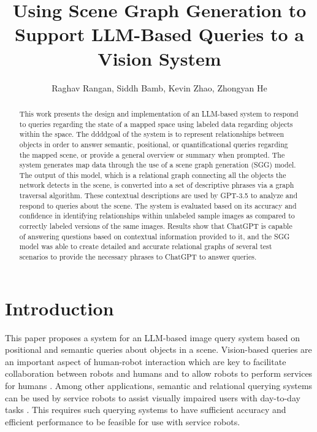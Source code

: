 \documentclass[letterpaper, 10 pt, conference]{ieeeconf}  %
\title{\LARGE \bf
Using Scene Graph Generation to Support LLM-Based Queries to a Vision System}
\author{Raghav Rangan, Siddh Bamb, Kevin Zhao, Zhongyan He%
}
\begin{document}
\maketitle
\thispagestyle{empty}
\pagestyle{empty}


\begin{abstract}
    This work presents the design and implementation of an LLM-based system to respond to queries regarding the state of a mapped space using labeled data regarding objects within the space. The ddddgoal of the system is to represent relationships between objects in order to answer semantic, positional, or quantificational queries regarding the mapped scene, or provide a general overview or summary when prompted. The system generates map data through the use of a scene graph generation (SGG) model. The output of this model, which is a relational graph connecting all the objects the network detects in the scene, is converted into a set of descriptive phrases via a graph traversal algorithm. These contextual descriptions are used by GPT-3.5 to analyze and respond to queries about the scene. The system is evaluated based on its accuracy and confidence in identifying relationships within unlabeled sample images as compared to correctly labeled versions of the same images. Results show that ChatGPT is capable of answering questions based on contextual information provided to it, and the SGG model was able to create detailed and accurate relational graphs of several test scenarios to provide the necessary phrases to ChatGPT to answer queries.
\end{abstract}
    
\section{Introduction}
    This paper proposes a system for an LLM-based image query system based on positional and semantic queries about objects in a scene. Vision-based queries are an important aspect of human-robot interaction which are key to facilitate collaboration between robots and humans and to allow robots to perform services for humans \cite{robinson2023vision}. Among other applications, semantic and relational querying systems can be used by service robots to assist visually impaired users with day-to-day tasks \cite{azenkot2016enabling}. This requires such querying systems to have sufficient accuracy and efficient performance to be feasible for use with service robots.
\end{document}
